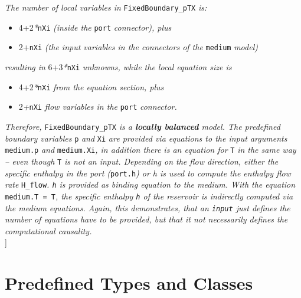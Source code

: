 \emph{The number of local variables in} \lstinline!FixedBoundary_pTX! \emph{is:}

\begin{itemize}
\item
  4+2\emph{*}\lstinline!nXi! \emph{(inside the} \lstinline!port! \emph{connector), plus}
\item
  2+\lstinline!nXi! \emph{(the input variables in the connectors of the} \lstinline!medium!
  \emph{model)}
\end{itemize}

\emph{resulting in} 6+3\emph{*}\lstinline!nXi! \emph{unknowns, while the local
equation size is}

\begin{itemize}
\item
  4+2\emph{*}\lstinline!nXi! \emph{from the equation section, plus}
\item
  2\emph{+}\lstinline!nXi! \emph{flow variables in the} \lstinline!port! \emph{connector.}
\end{itemize}

\emph{Therefore,} \lstinline!FixedBoundary_pTX! \emph{is a \textbf{locally
balanced} model. The predefined boundary variables} \lstinline!p! \emph{and} \lstinline!Xi!
\emph{are provided via equations to the input arguments} \lstinline!medium.p!
\emph{and} \lstinline!medium.Xi!\emph{, in addition there is an equation for} \lstinline!T!
\emph{in the same way -- even though} \lstinline!T! \emph{is not an input. Depending
on the flow direction, either the specific enthalpy in the port
(}\lstinline!port.h!\emph{) or h is used to compute the enthalpy flow rate}
\lstinline!H_flow!\emph{. \lstinline!h! is provided as binding equation to the medium. With
the equation} \lstinline!medium.T = T!\emph{, the specific enthalpy \lstinline!h! of the
reservoir is indirectly computed via the medium equations. Again, this
demonstrates, that an \lstinline!input! just defines the number of equations
have to be provided, but that it not necessarily defines the
computational causality.\\
}{]}

\section{Predefined Types and Classes}

